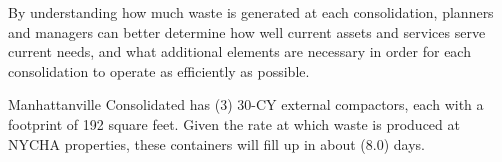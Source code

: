 
    By understanding how much waste is generated at each consolidation, planners and managers
    can better determine how well current assets and services serve current needs, and what additional 
    elements are necessary in order for each consolidation to operate as efficiently as possible. 

    Manhattanville Consolidated has (3) 30-CY external compactors, each with a footprint of 192 square feet. Given the rate at which waste is produced at NYCHA properties, these containers will fill
    up in about (8.0) days.